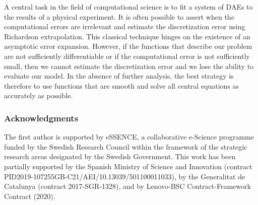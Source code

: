 \documentclass[runningheads]{llncs}
\begin{document}
A central task in the field of computational science is to fit a system of DAEs to the results of a physical experiment. It is often possible to assert when the computational errors are irrelevant and estimate the discretization error using Richardson extrapolation. This classical technique hinges on the existence of an asymptotic error expansion. However, if the functions that describe our problem are not sufficiently differentiable or if the computational error is not sufficiently small, then we cannot estimate the discretization error and we lose the ability to evaluate our model. In the absence of further analysis, the best strategy is therefore to use functions that are smooth and solve all central equations as accurately as possible.

\subsubsection{Acknowledgments}

The first author is supported by eSSENCE, a collaborative e-Science programme funded by the Swedish Research Council within the framework of the strategic research areas designated by the Swedish Government.
This work has been partially supported by the Spanish Ministry of Science and Innovation (contract PID2019-107255GB-C21/AEI/10.13039/501100011033), by the Generalitat de Catalunya (contract 2017-SGR-1328), and by Lenovo-BSC Contract-Framework Contract (2020).

%
%
%


 
\end{document}

